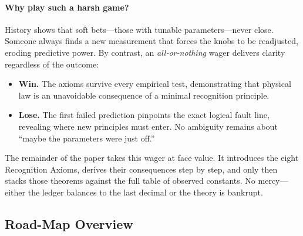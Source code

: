 \documentclass[11pt]{article}
\begin{document}
\paragraph{Why play such a harsh game?}
History shows that soft bets—those with tunable parameters—never close.  Someone always finds a new measurement that forces the knobs to be readjusted, eroding predictive power.  By contrast, an \emph{all‐or‐nothing} wager delivers clarity regardless of the outcome:
\begin{itemize}
  \item \textbf{Win.}  The axioms survive every empirical test, demonstrating that physical law is an unavoidable consequence of a minimal recognition principle.
  \item \textbf{Lose.}  The first failed prediction pinpoints the exact logical fault line, revealing where new principles must enter.  No ambiguity remains about “maybe the parameters were just off.”
\end{itemize}

The remainder of the paper takes this wager at face value.  It introduces the eight Recognition Axioms, derives their consequences step by step, and only then stacks those theorems against the full table of observed constants.  No mercy—either the ledger balances to the last decimal or the theory is bankrupt.

\subsection{Road-Map Overview}
\label{subsec:roadmap-overview}
\end{document}
